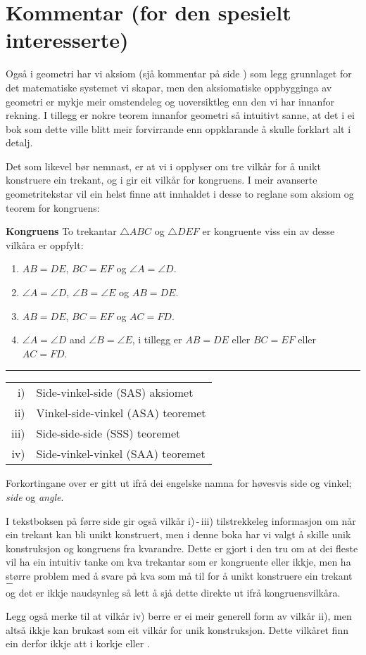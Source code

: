 



\section*{Kommentar (for den spesielt interesserte)}
Også i geometri har vi aksiom (sjå kommentar på side \pageref{Kommentar1}) som legg grunnlaget for det matematiske systemet vi skapar, men den aksiomatiske oppbygginga av geometri er mykje meir omstendeleg og uoversiktleg enn den vi har innanfor rekning. I tillegg er nokre teorem innanfor geometri så intuitivt sanne, at det i ei bok som dette ville blitt meir forvirrande enn oppklarande å skulle forklart alt i detalj.\vsk

Det som likevel bør nemnast, er at vi i  opplyser om tre vilkår for å unikt konstruere ein trekant, og i  gir eit vilkår for kongruens. I meir avanserte geometritekstar vil ein helst finne att innhaldet i desse to reglane som aksiom og teorem for kongruens: \regv

\begin{tcolorbox}[boxrule=0.3 mm,arc=0mm,colback=blue!5] {\large \textbf{Kongruens} \vspace{5 pt}}\newline
	To trekantar $ \triangle ABC $ og $ \triangle DEF $ er kongruente viss ein av desse vilkåra er oppfylt:
	\begin{enumerate}[label=\roman*)]
		\item $ AB=DE $, $ BC=EF $ og $ \angle A=\angle D $.
		\item $ \angle A=\angle D $, $ \angle B=\angle E $ og $ AB=DE $.
		\item $ AB=DE $, $ BC=EF $ og $ AC=FD $.
		\item $ {\angle A=\angle D} $ and $ {\angle B=\angle E} $, i tillegg er $ {AB=DE} $ eller $ BC=EF $ eller $ AC=FD $.
	\end{enumerate}
\rule{1\linewidth}{0.75bp}
\begin{center}
	\begin{tabular}{rl}
		i) &Side-vinkel-side (SAS) aksiomet\\
		ii) &Vinkel-side-vinkel (ASA) teoremet\\
		iii) & Side-side-side (SSS) teoremet \\
		iv) & Side-vinkel-vinkel (SAA) teoremet 
	\end{tabular}
\end{center}
\mer Forkortingane over er gitt ut ifrå dei engelske namna for høvesvis side og vinkel; \textit{side} og \textit{angle}.
\end{tcolorbox}
\newpage
I tekstboksen på førre side gir også vilkår i)\,-\,iii) tilstrekkeleg informasjon om når ein trekant kan bli unikt konstruert, men i denne boka har vi valgt å skille unik konstruksjon og kongruens fra kvarandre. Dette er gjort i den tru om at dei fleste vil ha ein intuitiv tanke om kva trekantar som er kongruente eller ikkje, men ha større problem med å svare på kva som må til for å unikt konstruere ein trekant $ - $ \\og det er ikkje naudsynleg så lett å sjå dette direkte ut ifrå kongruensvilkåra.\vsk

Legg også merke til at vilkår iv) berre er ei meir generell form av vilkår ii), men altså ikkje kan brukast som eit vilkår for unik konstruksjon. Dette vilkåret finn ein derfor ikkje att i korkje  eller .


